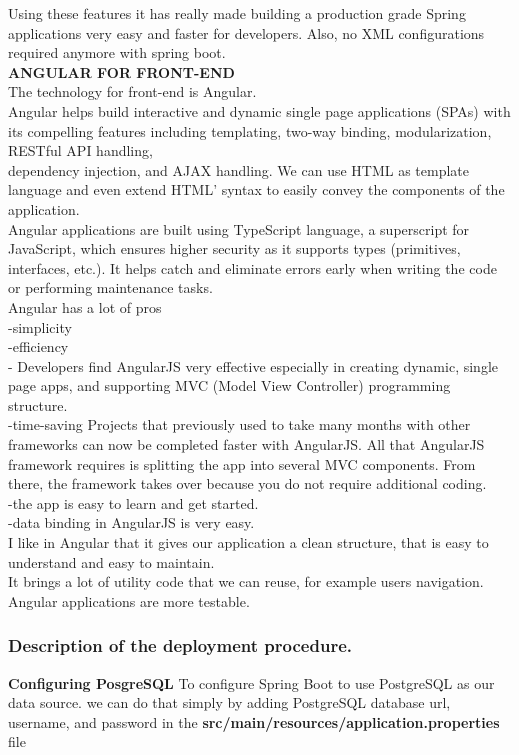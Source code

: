 \documentclass{scrartcl}
\begin{document}
Using these features it has really made building a production grade Spring applications very easy and faster for developers. Also, no XML configurations required anymore with spring boot.\\

\textbf{ANGULAR FOR FRONT-END} \\
The technology for front-end is Angular.\\
Angular helps build interactive and dynamic single page applications (SPAs) with its compelling features including templating, two-way binding, modularization, RESTful API handling,\\ dependency injection, and AJAX handling. We can use HTML as template language and even extend HTML’ syntax to easily convey the components of the application.\\
Angular applications are built using TypeScript language, a superscript for JavaScript, which ensures higher security as it supports types (primitives, interfaces, etc.). It helps catch and eliminate errors early when writing the code or performing maintenance tasks.\\
Angular has a lot of pros\\
-simplicity\\
-efficiency\\
- Developers find AngularJS very effective especially in creating dynamic, single page apps, and supporting MVC (Model View Controller) programming structure.\\
-time-saving Projects that previously used to take many months with other frameworks can now be completed faster with AngularJS. All that AngularJS framework requires is splitting the app into several MVC components. From there, the framework takes over because you do not require additional coding.\\
-the app is easy to learn and get started.\\
-data binding in AngularJS is very easy.\\
I like in Angular that it gives our application a clean structure, that is easy to understand and easy to maintain.\\
It brings a lot of utility code that we can reuse, for example users navigation. Angular applications are more testable.\\

\subsubsection{Description of the deployment procedure.}
\textbf{Configuring PosgreSQL}
 To configure Spring Boot to use PostgreSQL as our data source. we can do that simply by adding PostgreSQL database url, username, and password in the \textbf{src/main/resources/application.properties} file \\
 
\end{document}
